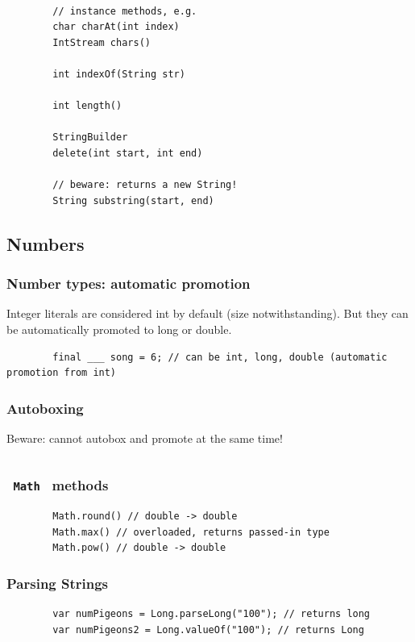 \documentclass{scrartcl}
\begin{document}
    \begin{lstlisting}

        // instance methods, e.g.
        char charAt(int index)
        IntStream chars()

        int indexOf(String str)

        int length()

        StringBuilder
        delete(int start, int end)

        // beware: returns a new String!
        String substring(start, end)
    \end{lstlisting}

\subsection{Numbers}
\subsubsection{Number types: automatic promotion}

    Integer literals are considered int by default (size notwithstanding). But they can be automatically promoted to long or double.

    \begin{lstlisting}
        final ___ song = 6; // can be int, long, double (automatic promotion from int)
    \end{lstlisting}

\subsubsection{Autoboxing}

    Beware: cannot autobox and promote at the same time!

    \begin{lstlisting}

    \end{lstlisting}


\subsubsection{\lstinline$ Math $ methods}
    \begin{lstlisting}
        Math.round() // double -> double
        Math.max() // overloaded, returns passed-in type
        Math.pow() // double -> double
    \end{lstlisting}

\subsubsection{Parsing Strings}
    \begin{lstlisting}
        var numPigeons = Long.parseLong("100"); // returns long
        var numPigeons2 = Long.valueOf("100"); // returns Long
    \end{lstlisting}
\end{document}
